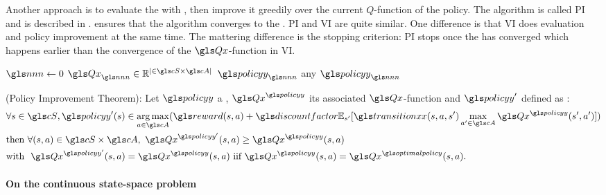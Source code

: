 Another approach is to evaluate the  with , then improve it greedily over the current $Q$-function of the policy. The algorithm is called \gls{PI}~\parencite{howard60} and is described in .  ensures that the algorithm converges to the  . \gls{PI} and \gls{VI} are quite similar. One difference is that \gls{VI} does evaluation and policy improvement at the same time. The mattering difference is the stopping criterion: \gls{PI} stops once the  has converged which happens earlier than the convergence of the $\Q$-function in \gls{VI}.

\begin{algorithm}
    \DontPrintSemicolon
    $\n\leftarrow 0$\;
    $\Q_{\n}\in \mathbb{R}^{|\in\cS\times\cA|}$\;
    $\policy_{\n}$  any \;
    \Return $\policy_{\n}$\;
    \caption{Policy-Iteration}
    \label{alg:policy-iteration}
\end{algorithm}

\begin{theorem}{(Policy Improvement Theorem)}:
    Let $\policy$ a , $\Q^{\policy}$ its associated $\Q$-function and $\policy'$ defined as :
    \begin{align}
        &\forall s\in\cS, \policy'(s)\in \argmax_{a\in\cA} (\reward(s,a) + \discountfactor \mathbb{E}_{s'}[ \transition(s,a,s') \max_{a'\in \cA} \Q^{\policy}(s',a')])\\\nonumber
        & \text{then } \forall (s,a)\in\cS \times \cA,\ \Q^{\policy'}(s,a) \geq \Q^{\policy}(s,a)\\\nonumber
        & \text{with } \ \Q^{\policy'}(s,a) = \Q^{\policy}(s,a) \text{ iif } \Q^{\policy}(s,a) = \Q^{\optimalpolicy}(s,a).
    \end{align}
    \label{th:policy-improvment-theorem}
\end{theorem}

\paragraph{On the continuous state-space problem}

